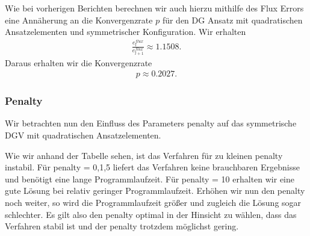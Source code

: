 Wie bei vorherigen Berichten berechnen wir auch hierzu mithilfe des Flux Errors eine Annäherung an die Konvergenzrate $p$ für den DG Ansatz mit quadratischen Ansatzelementen und symmetrischer Konfiguration.
Wir erhalten 
\begin{align*}
 \frac{e_l^{flux}}{e_{l+1}^{flux}} \approx 1.1508.
\end{align*}
Daraus erhalten wir die Konvergenzrate
\begin{align*}
  p \approx 0.2027.
\end{align*}

\subsubsection*{Penalty}
Wir betrachten nun den Einfluss des Parameters penalty auf das symmetrische DGV mit quadratischen Ansatzelementen.

\begin{figure}[H]
	\centering
\end{figure}

Wie wir anhand der Tabelle sehen, ist das Verfahren für zu kleinen penalty instabil. Für penalty = 0,1,5 liefert das Verfahren keine brauchbaren Ergebnisse und benötigt eine lange Programmlaufzeit.
Für penalty = 10 erhalten wir eine gute Lösung bei relativ geringer Programmlaufzeit. Erhöhen wir nun den penalty noch weiter, so wird die Programmlaufzeit größer und zugleich die Lösung sogar schlechter. Es gilt also den penalty optimal in der Hinsicht zu wählen, dass das Verfahren stabil ist und der penalty trotzdem möglichst gering.



